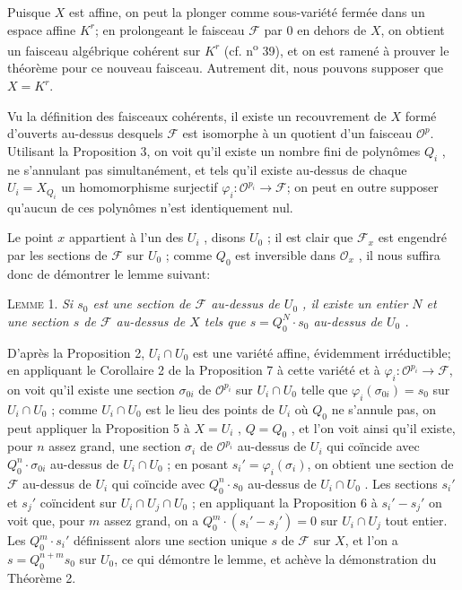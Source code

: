 Puisque $X$ est affine, on peut la plonger comme sous-variété fermée dans un espace affine $K^r$; en prolongeant le faisceau $\mathcal{F}$ par 0 en dehors de $X$, on obtient un faisceau algébrique cohérent sur $K^r$ (cf. n\textsuperscript{o} 39), et on est ramené à prouver le théorème pour ce nouveau faisceau. Autrement dit, nous pouvons supposer que $X = K^r$.

Vu la définition des faisceaux cohérents, il existe un recouvrement de $X$ formé d'ouverts au-dessus desquels $\mathcal{F}$ est isomorphe à un quotient d'un faisceau $\mathcal{O}^p$. Utilisant la Proposition 3, on voit qu'il existe un nombre fini de polynômes $Q_i$ , ne s'annulant pas simultanément, et tels qu'il existe au-dessus de chaque $U_i = X_{Q_i}$ un homomorphisme surjectif $\varphi_i : \mathcal{O}^{p_i} \to \mathcal{F}$; on peut en outre supposer qu'aucun de ces polynômes n'est identiquement nul.

Le point $x$ appartient à l'un des $U_i$ , disons $U_0$ ; il est clair que $\mathcal{F}_x$ est engendré par les sections de $\mathcal{F}$ sur $U_0$ ; comme $Q_0$ est inversible dans $\mathcal{O}_x$ , il nous suffira donc de démontrer le lemme suivant:

\textsc{Lemme} 1. \textit{Si $s_0$ est une section de $\mathcal{F}$ au-dessus de $U_0$ , il existe un entier $N$ et une section $s$ de $\mathcal{F}$ au-dessus de $X$ tels que $s = Q_0^N \cdot s_0$ au-dessus de $U_0$ .}

D'après la Proposition 2, $U_i \cap U_0$ est une variété affine, évidemment irréductible; en appliquant le Corollaire 2 de la Proposition 7 à cette variété et à $\varphi_i : \mathcal{O}^{p_i} \to \mathcal{F}$, on voit qu'il existe une section $\sigma_{0i}$ de $\mathcal{O}^{p_i}$ sur $U_i \cap U_0$ telle que $\varphi_i(\sigma_{0i}) = s_0$ sur $U_i \cap U_0$ ; comme $U_i \cap U_0$ est le lieu des points de $U_i$ où $Q_0$ ne s'annule pas, on peut appliquer la Proposition 5 à $X = U_i$ , $Q = Q_0$ , et l'on voit ainsi qu'il existe, pour $n$ assez grand, une section $\sigma_i$ de $\mathcal{O}^{p_i}$ au-dessus de $U_i$ qui coïncide avec $Q_0^n \cdot \sigma_{0i}$ au-dessus de $U_i \cap U_0$ ; en posant $s_i' = \varphi_i(\sigma_i)$, on
obtient une section de $\mathcal{F}$ au-dessus de $U_i$ qui coïncide avec $Q_0^n \cdot s_0$ au-dessus de $U_i \cap U_0$ . Les sections $s_i'$ et $s_j'$ coïncident sur $U_i \cap U_j \cap U_0$ ; en appliquant la Proposition 6 à $s_i' - s_j'$ on voit que, pour $m$ assez grand, on a $Q_0^m \cdot (s_i' - s_j') = 0$ sur $U_i \cap U_j$ tout entier. Les $Q_0^m \cdot s_i'$ définissent alors une section unique $s$ de $\mathcal{F}$ sur $X$, et l'on a $s = Q_0^{n+m} s_0$ sur $U_0$, ce qui démontre le lemme, et achève la démonstration du Théorème 2.

